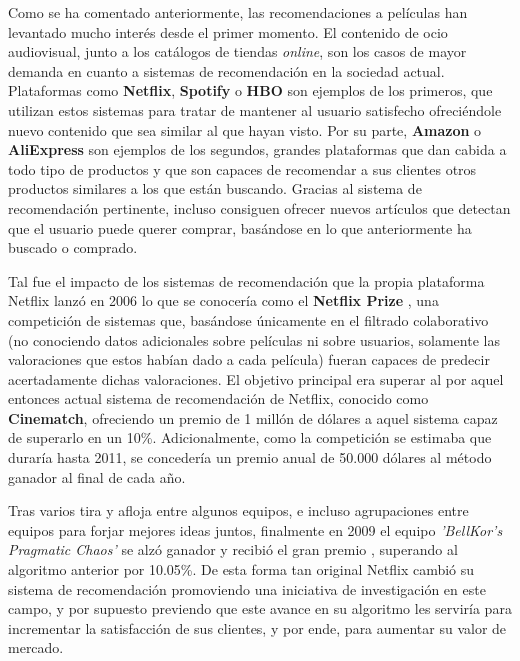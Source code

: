 Como se ha comentado anteriormente, las recomendaciones a películas han levantado mucho interés desde el primer momento. El contenido de ocio audiovisual, junto a los catálogos de tiendas \textit{online}, son los casos de mayor demanda en cuanto a sistemas de recomendación en la sociedad actual. Plataformas como \textbf{Netflix}, \textbf{Spotify} o \textbf{HBO} son ejemplos de los primeros, que utilizan estos sistemas para tratar de mantener al usuario satisfecho ofreciéndole nuevo contenido que sea similar al que hayan visto. Por su parte, \textbf{Amazon} o \textbf{AliExpress} son ejemplos de los segundos, grandes plataformas que dan cabida a todo tipo de productos y que son capaces de recomendar a sus clientes otros productos similares a los que están buscando. Gracias al sistema de recomendación pertinente, incluso consiguen ofrecer nuevos artículos que detectan que el usuario puede querer comprar, basándose en lo que anteriormente ha buscado o comprado.

Tal fue el impacto de los sistemas de recomendación que la propia plataforma Netflix lanzó en 2006 lo que se conocería como el \textbf{Netflix Prize} \cite{netflix-prize}, una competición de sistemas que, basándose únicamente en el filtrado colaborativo (no conociendo datos adicionales sobre películas ni sobre usuarios, solamente las valoraciones que estos habían dado a cada película) fueran capaces de predecir acertadamente dichas valoraciones. El objetivo principal era superar al por aquel entonces actual sistema de recomendación de Netflix, conocido como \textbf{Cinematch}, ofreciendo un premio de 1 millón de dólares a aquel sistema capaz de superarlo en un 10\%. Adicionalmente, como la competición se estimaba que duraría hasta 2011, se concedería un premio anual de 50.000 dólares al método ganador al final de cada año.

Tras varios tira y afloja entre algunos equipos, e incluso agrupaciones entre equipos para forjar mejores ideas juntos, finalmente en 2009 el equipo \textit{'BellKor's Pragmatic Chaos'} se alzó ganador y recibió el gran premio \cite{netflix-prize-winner}, superando al algoritmo anterior por 10.05\%. De esta forma tan original Netflix cambió su sistema de recomendación promoviendo una iniciativa de investigación en este campo, y por supuesto previendo que este avance en su algoritmo les serviría para incrementar la satisfacción de sus clientes, y por ende, para aumentar su valor de mercado.
